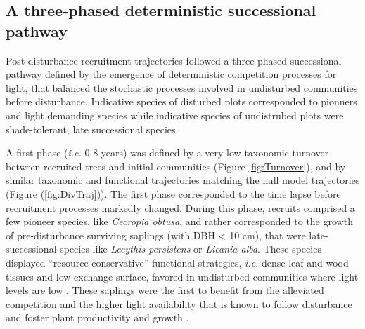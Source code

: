 \documentclass[fleqn,10pt]{ArtEcoFoG} %
\begin{document}
\subsection{A three-phased deterministic successional
pathway}\label{a-three-phased-deterministic-successional-pathway}

Post-disturbance recruitment trajectories followed a three-phased
successional pathway defined by the emergence of deterministic
competition processes for light, that balanced the stochastic processes
involved in undisturbed communities before disturbance. Indicative
species of disturbed plots corresponded to pionners and light demanding
species while indicative species of undistrubed plots were
shade-tolerant, late successional species.

A first phase (\emph{i.e.} 0-8 years) was defined by a very low
taxonomic turnover between recruited trees and initial communities
(Figure \ref{fig:Turnover}), and by similar taxonomic and functional
trajectories matching the null model trajectories (Figure
(\ref{fig:DivTraj})). The first phase corresponded to the time lapse
before recruitment processes markedly changed. During this phase,
recruits comprised a few pioneer species, like \emph{Cecropia obtusa},
and rather corresponded to the growth of pre-disturbance surviving
saplings (with DBH \textless{} 10 cm), that were late-successional
species like \emph{Lecythis persistens} or \emph{Licania alba}. These
species displayed ``resource-conservative'' functional strategies,
\emph{i.e.} dense leaf and wood tissues and low exchange surface,
favored in undisturbed communities where light levels are low
\citep{Peet1992, Denslow2000}. These saplings were the first to benefit
from the alleviated competition and the higher light availability that
is known to follow disturbance and foster plant productivity and growth
\citep{Monteith1972, Chazdon1984}.
\end{document}
